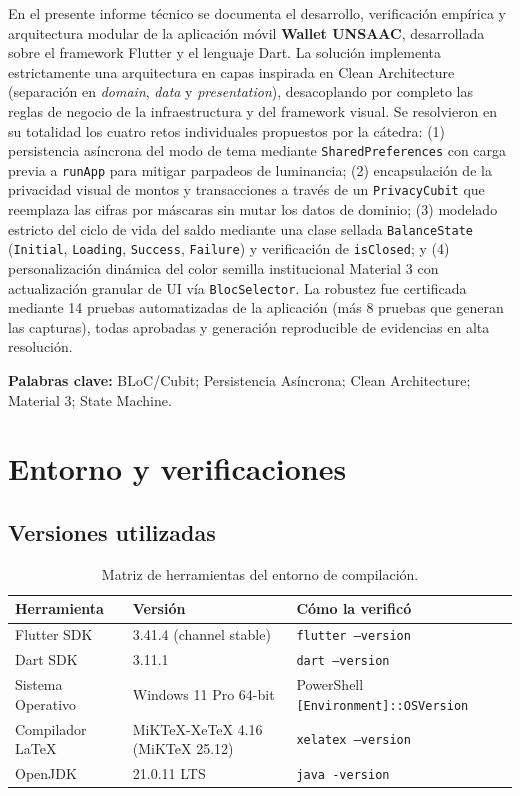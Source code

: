 \documentclass[12pt,a4paper]{article}
\begin{document}
En el presente informe técnico se documenta el desarrollo, verificación empírica y arquitectura modular de la aplicación móvil \textbf{Wallet UNSAAC}, desarrollada sobre el framework Flutter y el lenguaje Dart. La solución implementa estrictamente una arquitectura en capas inspirada en Clean Architecture (separación en \textit{domain}, \textit{data} y \textit{presentation}), desacoplando por completo las reglas de negocio de la infraestructura y del framework visual. Se resolvieron en su totalidad los cuatro retos individuales propuestos por la cátedra: (1) persistencia asíncrona del modo de tema mediante \texttt{SharedPreferences} con carga previa a \texttt{runApp} para mitigar parpadeos de luminancia; (2) encapsulación de la privacidad visual de montos y transacciones a través de un \texttt{PrivacyCubit} que reemplaza las cifras por máscaras sin mutar los datos de dominio; (3) modelado estricto del ciclo de vida del saldo mediante una clase sellada \texttt{BalanceState} (\texttt{Initial}, \texttt{Loading}, \texttt{Success}, \texttt{Failure}) y verificación de \texttt{isClosed}; y (4) personalización dinámica del color semilla institucional Material 3 con actualización granular de UI vía \texttt{BlocSelector}. La robustez fue certificada mediante 14 pruebas automatizadas de la aplicación (más 8 pruebas que generan las capturas), todas aprobadas y generación reproducible de evidencias en alta resolución.

\noindent\textbf{Palabras clave:} BLoC/Cubit; Persistencia Asíncrona; Clean Architecture; Material 3; State Machine.

\section{Entorno y verificaciones}

\subsection{Versiones utilizadas}
\begin{table}[h!]
\centering
\begin{tabular}{@{}lll@{}}
\toprule
\textbf{Herramienta} & \textbf{Versión} & \textbf{Cómo la verificó} \\
\midrule
Flutter SDK & 3.41.4 (channel stable) & \texttt{flutter --version} \\
Dart SDK & 3.11.1 & \texttt{dart --version} \\
Sistema Operativo & Windows 11 Pro 64-bit & PowerShell \texttt{[Environment]::OSVersion} \\
Compilador LaTeX & MiKTeX-XeTeX 4.16 (MiKTeX 25.12) & \texttt{xelatex --version} \\
OpenJDK & 21.0.11 LTS & \texttt{java -version} \\
\bottomrule
\end{tabular}
\caption{Matriz de herramientas del entorno de compilación.}
\end{table}
\end{document}
